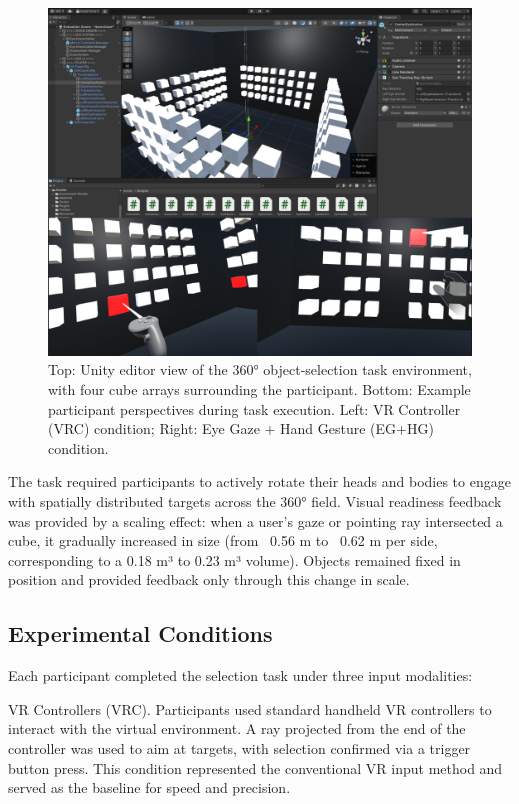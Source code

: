 \documentclass[utf8]{FrontiersinHarvard} %
\begin{document}
\begin{figure}[ht]
\begin{center}
\includegraphics[width=15cm]{figures/unity.png}
\end{center}
\caption{Top: Unity editor view of the 360° object-selection task environment, with four cube arrays surrounding the participant. Bottom: Example participant perspectives during task execution. Left: VR Controller (VRC) condition; Right: Eye Gaze + Hand Gesture (EG+HG) condition.}
\label{fig:unity}
\end{figure}

The task required participants to actively rotate their heads and bodies to engage with spatially distributed targets across the 360° field. Visual readiness feedback was provided by a scaling effect: when a user's gaze or pointing ray intersected a cube, it gradually increased in size (from ~0.56 m to ~0.62 m per side, corresponding to a 0.18 m³ to 0.23 m³ volume). Objects remained fixed in position and provided feedback only through this change in scale.


\subsection{Experimental Conditions}
Each participant completed the selection task under three input modalities:

VR Controllers (VRC). Participants used standard handheld VR controllers to interact with the virtual environment. A ray projected from the end of the controller was used to aim at targets, with selection confirmed via a trigger button press. This condition represented the conventional VR input method and served as the baseline for speed and precision.
\end{document}
